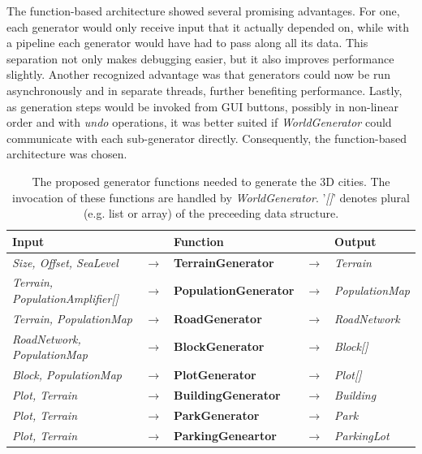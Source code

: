 The function-based architecture showed several promising advantages.
For one, each generator would only receive input that it actually depended on, while with a pipeline each generator would have had to pass along all its data.
This separation not only makes debugging easier, but it also improves performance slightly.
Another recognized advantage was that generators could now be run asynchronously and in separate threads, further benefiting performance.
Lastly, as generation steps would be invoked from GUI buttons, possibly in non-linear order and with \textit{undo} operations, it was better suited if \textit{WorldGenerator} could communicate with each sub-generator directly.
Consequently, the function-based architecture was chosen.

\begin{table}[H]
  \centering
  \begin{tabular}{lllll}
    \textbf{Input}                           &               & \textbf{Function}            &               & \textbf{Output}         \\
    \midrule
    \textit{Size, Offset, SeaLevel}          & $\rightarrow$ & \textbf{TerrainGenerator}    & $\rightarrow$ & \textit{Terrain}        \\
    \textit{Terrain, PopulationAmplifier[]}  & $\rightarrow$ & \textbf{PopulationGenerator} & $\rightarrow$ & \textit{PopulationMap}  \\
    \textit{Terrain, PopulationMap}          & $\rightarrow$ & \textbf{RoadGenerator}       & $\rightarrow$ & \textit{RoadNetwork}    \\
    \textit{RoadNetwork, PopulationMap}      & $\rightarrow$ & \textbf{BlockGenerator}      & $\rightarrow$ & \textit{Block[]}        \\
    \textit{Block, PopulationMap}            & $\rightarrow$ & \textbf{PlotGenerator}       & $\rightarrow$ & \textit{Plot[]}         \\
    \textit{Plot, Terrain}                   & $\rightarrow$ & \textbf{BuildingGenerator}   & $\rightarrow$ & \textit{Building}       \\
    \textit{Plot, Terrain}                   & $\rightarrow$ & \textbf{ParkGenerator}       & $\rightarrow$ & \textit{Park}           \\
    \textit{Plot, Terrain}                   & $\rightarrow$ & \textbf{ParkingGeneartor}    & $\rightarrow$ & \textit{ParkingLot}     \\
    \bottomrule
  \end{tabular}

  \caption[]{The proposed generator functions needed to generate the 3D cities. The invocation of these functions are handled by \textit{WorldGenerator}. '\textit{[]}' denotes plural (e.g. list or array) of the preceeding data structure.}
  \label{table:generators}
\end{table}
\vspace{-0.4cm} %

